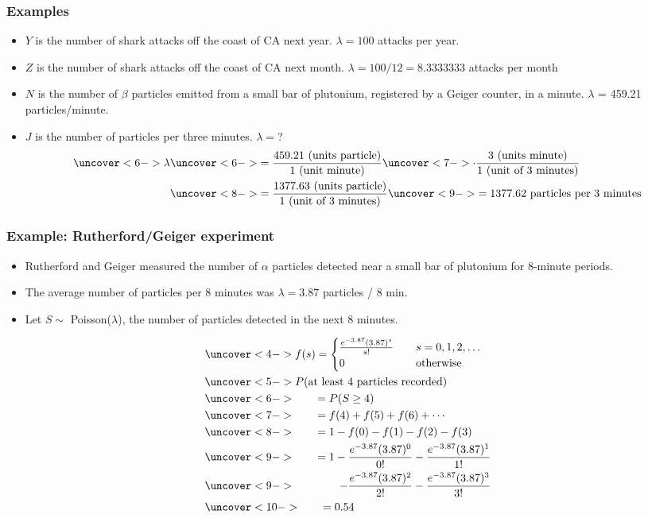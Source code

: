 \documentclass[handout]{beamer}\usepackage[]{graphicx}\usepackage[]{color}
\numberwithin{equation}{section}
\begin{document}
\begin{frame}
\frametitle{Examples} \small
\begin{itemize}
\pause \item $Y$ is the number of shark attacks off the coast of CA next year. $\lambda = 100$ attacks per year.
\pause \item $Z$ is the number of shark attacks off the coast of CA next month. $\lambda = 100/12 = 8.3333333$ attacks per month
\pause \item $N$ is the number of $\beta$ particles emitted from a small bar of plutonium, registered by a Geiger counter, in a minute. $\lambda$ = 459.21 particles/minute.
\pause \item $J$ is the number of particles per three minutes. $\lambda = $?
\begin{align*}
\uncover<6->{\lambda} &\uncover<6->{= \frac{459.21 \text{ (units particle)}}{1 {\text{ (unit minute)}}}} \uncover<7->{\cdot \frac{3 {\text{ (units minute})}}{1 \text{ (unit of 3 minutes})}} \\
&\uncover<8->{= \frac{1377.63 \text{ (units particle)}}{1 \text{ (unit of 3 minutes)}}} \uncover<9->{= 1377.62 \text{ particles per 3 minutes}}
\end{align*}
\end{itemize}
\end{frame}

\begin{frame}
\frametitle{Example: Rutherford/Geiger experiment} \scriptsize
\begin{itemize}
\pause \item Rutherford and Geiger measured the number of $\alpha$ particles detected near a small bar of plutonium for 8-minute periods.
\pause \item The average number of particles per 8 minutes was $\lambda = 3.87$ particles / 8 min.
\pause \item Let $S \sim $ Poisson($\lambda$), the number of particles detected in the next 8 minutes. 
\end{itemize}
\begin{align*}
&\uncover<4->{f(s) = \begin{cases}
\frac{e^{-3.87}(3.87)^s}{s!} & \quad s = 0, 1, 2, \ldots \\
0 & \quad \text{otherwise}
\end{cases}} \\
&\uncover<5->{P(\text{at least 4 particles recorded})} \\
& \uncover<6->{\qquad = P(S \ge 4)} \\
& \uncover<7->{\qquad = f(4) + f(5) + f(6) + \cdots} \\
& \uncover<8->{\qquad = 1 - f(0) - f(1) - f(2) - f(3)} \\
& \uncover<9->{\qquad = 1 - \frac{e^{-3.87}(3.87)^0}{0!}  - \frac{e^{-3.87}(3.87)^1}{1!}} \\
& \uncover<9->{ \qquad \qquad  - \frac{e^{-3.87}(3.87)^2}{2!} - \frac{e^{-3.87}(3.87)^3}{3!}} \\
& \uncover<10->{\qquad = 0.54}
\end{align*}
\end{frame}
\end{document}
